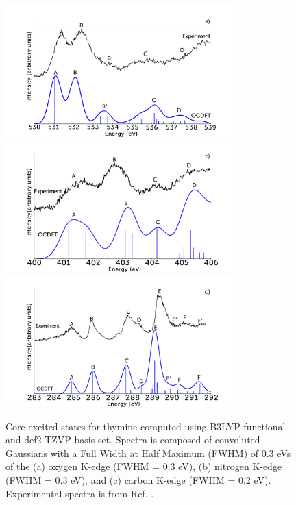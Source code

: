 \documentclass[8.5pt,twoside,twocolumn]{article}
\begin{document}
  \begin{figure}[!t]
\centering
\includegraphics[width=8.8cm]{ThymineOKexperiment.png}\\
\includegraphics[width=8.8cm]{ThymineNKexperiment.png} \\
\includegraphics[width=8.8cm]{ThymineCKexperiment.png}
\caption{Core excited states for thymine computed using B3LYP functional and def2-TZVP basis set. Spectra is composed of convoluted Gaussians with a Full Width at Half Maximum (FWHM) of 0.3 eVs of the (a) oxygen K-edge (FWHM = 0.3 eV), (b) nitrogen K-edge (FWHM = 0.3 eV), and (c) carbon K-edge (FWHM = 0.2 eV). Experimental spectra is from Ref. .}
\label{figure:Thymine}
\end{figure}
\end{document}
